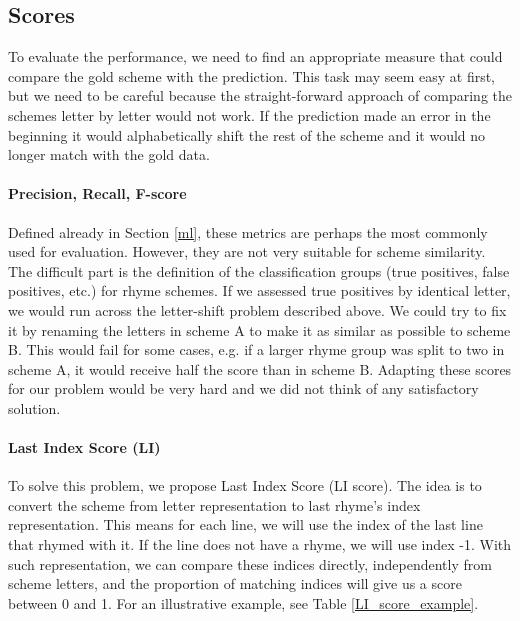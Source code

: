 \subsection{Scores}
To evaluate the performance, we need to find an appropriate measure that could compare the gold scheme with the prediction. This task may seem easy at first, but we need to be careful because the straight-forward approach of comparing the schemes letter by letter would not work. If the prediction made an error in the beginning it would alphabetically shift the rest of the scheme and it would no longer match with the gold data.

\paragraph{Precision, Recall, F-score} Defined already in Section \ref{ml}, these metrics are perhaps the most commonly used for evaluation. However, they are not very suitable for scheme similarity. The difficult part is the definition of the classification groups (true positives, false positives, etc.) for rhyme schemes. If we assessed true positives by identical letter, we would run across the letter-shift problem described above. We could try to fix it by renaming the letters in scheme A to make it as similar as possible to scheme B. This would fail for some cases, e.g. if a larger rhyme group was split to two in scheme A, it would receive half the score than in scheme B. Adapting these scores for our problem would be very hard and we did not think of any satisfactory solution.

\paragraph{Last Index Score (LI)} To solve this problem, we propose Last Index Score (LI score). The idea is to convert the scheme from letter representation to last rhyme's index representation. This means for each line, we will use the index of the last line that rhymed with it. If the line does not have a rhyme, we will use index -1. With such representation, we can compare these indices directly, independently from scheme letters, and the proportion of matching indices will give us a score between 0 and 1. For an illustrative example, see Table \ref{LI_score_example}.


